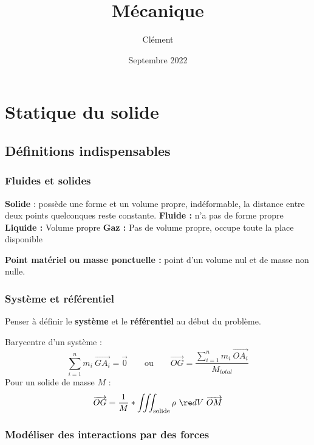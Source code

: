 \documentclass[13pt, twoside, a4paper, french]{report}
\newcommand*{\getSubject}{Mécanique}
\begin{document}
\title{\getSubject}
\author{Clément }
\date{Septembre 2022}
\tableofcontents


\chapter{Statique du solide}\label{ch:statique-du-solide}


    \section{Définitions indispensables}\label{sec:definitions-indispensables}

        \subsection{Fluides et solides}\label{subsec:fluides-et-solides}

            \begin{outline}
                \1 \textbf{Solide} : possède une forme et un volume propre, indéformable, la distance entre deux points quelconques reste constante.
                \1 \textbf{Fluide :} n'a pas de forme propre
                \2 \textbf{Liquide :} Volume propre
                \2 \textbf{Gaz :} Pas de volume propre, occupe toute la place disponible
            \end{outline}

            \textbf{Point matériel ou masse ponctuelle :} point d'un volume nul et de masse non nulle.

        \subsection{Système et référentiel}\label{subsec:systeme-et-referentiel}

            Penser à définir le \textbf{système} et le \textbf{référentiel} au début du problème.

            Barycentre d'un système :
            \[\sum_{i=1}^n m_i\ \overrightarrow{GA_i} = \overrightarrow{0} \qquad \text{ou} \qquad \overrightarrow{OG} = \dfrac{\sum_{i=1}^n m_i\ \overrightarrow{OA_i}}{M_{total}}\]
            Pour un solide de masse $M$ :
            \[\overrightarrow{OG} = \dfrac{1}{M} * \iiint_{\text{solide}} {\rho\ \re d V\ \overrightarrow{OM}} \]

        \subsection{Modéliser des interactions par des forces}\label{subsec:modeliser-des-interactions-par-des-forces}
\end{document}
